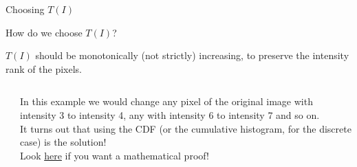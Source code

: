 \documentclass[9pt, aspectratio=169]{beamer}
\begin{document}
\begin{frame}
    {Choosing $T(I)$}

    How do we choose $T(I)$?

    $T(I)$ should be monotonically (not strictly) increasing, to preserve the intensity rank of the pixels.

    \begin{columns}
        \begin{column}{.6\textwidth}
        \end{column}
        \begin{column}{.4\textwidth}
            In this example we would change any pixel of the original image with intensity 3 to intensity 4, any with intensity 6 to intensity 7 and so on.\\
            \pause
            It turns out that using the CDF (or the cumulative histogram, for the discrete case) is the solution!\\
            Look \href{https://www.math.uci.edu/icamp/courses/math77c/demos/hist_eq.pdf}{here} if you want a mathematical proof!
        \end{column}
    \end{columns}
\end{frame}
\end{document}
